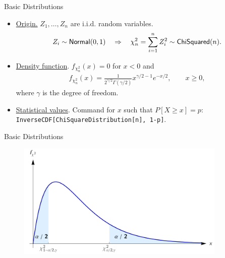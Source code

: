\begin{frame}{Basic Distributions}

\begin{itemize}
	\item \underline{Origin.} $Z_1, \ldots, Z_n$ are i.i.d. random variables.
	\begin{align*}
	Z_i\sim \mathsf{Normal}(0, 1) \quad \Rightarrow\quad \chi_n^2 = \sum_{i=1}^n Z_i^2 \sim \mathsf{ChiSquared}(n).
	\end{align*}
	\item \underline{Density function}. $f_{\chi_n^2}(x) = 0$ for $x < 0$ and
	\begin{align*}
	f_{\chi_n^2}(x) = \frac{1}{2^{\gamma/2}\Gamma(\gamma/2)} x^{\gamma/2-1} e^{-x/2}, \qquad x \geq 0,
	\end{align*}
	where $\gamma$ is the degree of freedom.
	\item \underline{Statistical values}. Command for $x$ such that $P[X\geq x] = p$:\\
	\texttt{InverseCDF[ChiSquareDistribution[n], 1-p]}.
\end{itemize}

\end{frame}

\begin{frame}{Basic Distributions}

\begin{figure}[htbp]
	\centering
	\includegraphics[width=10cm]{./images/rc4fig4.png}
\end{figure}

\end{frame}


